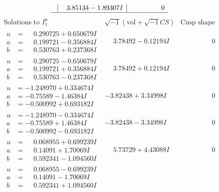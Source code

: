 \documentclass[1p]{elsarticle_modified}
\theoremstyle{definition}
\newcommand{\I}{\sqrt{-1}}
\begin{document}
$$\begin{array}{c|c|c}
 & \phantom{-}3.85134 - 1.89307 I & \phantom{-0.000000 } 0\\
 \hline 
 \end{array}$$\newpage$$\begin{array}{c|c|c}  
\text{Solutions to }I^u_{1}& \I (\text{vol} + \sqrt{-1}CS) & \text{Cusp shape}\\
 \hline 
\begin{aligned}
u &= \phantom{-}0.290725 + 0.650679 I \\
a &= \phantom{-}0.199721 - 0.356884 I \\
b &= \phantom{-}0.530763 + 0.237368 I\end{aligned}
 & \phantom{-}3.78492 - 0.12194 I & \phantom{-0.000000 } 0 \\ \hline\begin{aligned}
u &= \phantom{-}0.290725 - 0.650679 I \\
a &= \phantom{-}0.199721 + 0.356884 I \\
b &= \phantom{-}0.530763 - 0.237368 I\end{aligned}
 & \phantom{-}3.78492 + 0.12194 I & \phantom{-0.000000 } 0 \\ \hline\begin{aligned}
u &= -1.248970 + 0.334674 I \\
a &= -0.75589 - 1.46384 I \\
b &= -0.500992 + 0.693182 I\end{aligned}
 & -3.82438 + 3.34998 I & \phantom{-0.000000 } 0 \\ \hline\begin{aligned}
u &= -1.248970 - 0.334674 I \\
a &= -0.75589 + 1.46384 I \\
b &= -0.500992 - 0.693182 I\end{aligned}
 & -3.82438 - 3.34998 I & \phantom{-0.000000 } 0 \\ \hline\begin{aligned}
u &= \phantom{-}0.068955 + 0.699239 I \\
a &= \phantom{-}0.14091 + 1.70069 I \\
b &= \phantom{-}0.592341 - 1.094560 I\end{aligned}
 & \phantom{-}5.73729 + 4.43088 I & \phantom{-0.000000 } 0 \\ \hline\begin{aligned}
u &= \phantom{-}0.068955 - 0.699239 I \\
a &= \phantom{-}0.14091 - 1.70069 I \\
b &= \phantom{-}0.592341 + 1.094560 I\end{aligned}

\end{array}$$
\end{document}
